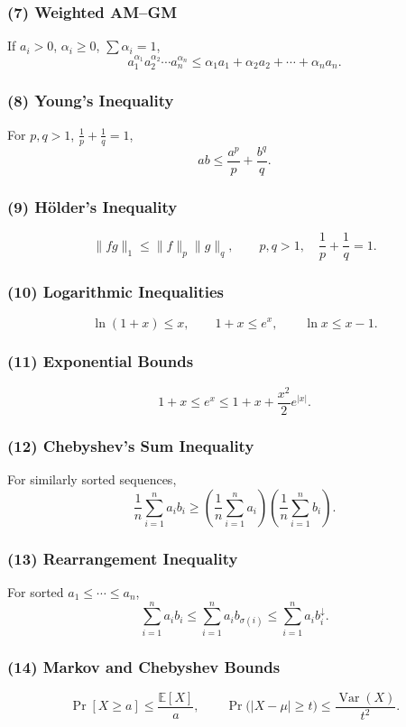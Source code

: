 \documentclass[10pt]{article}
\theoremstyle{definition}
\begin{document}
\subsubsection*{(7) Weighted AM--GM}
If \(a_i > 0\), \(\alpha_i \ge 0\), \(\sum\alpha_i = 1\),
\[
a_1^{\alpha_1} a_2^{\alpha_2}\cdots a_n^{\alpha_n}
\le
\alpha_1 a_1 + \alpha_2 a_2 + \cdots + \alpha_n a_n.
\]

\subsubsection*{(8) Young's Inequality}
For \(p,q>1\), \(\tfrac{1}{p}+\tfrac{1}{q}=1\),
\[
ab \le \frac{a^p}{p} + \frac{b^q}{q}.
\]

\subsubsection*{(9) Hölder's Inequality}
\[
\|fg\|_1 \le \|f\|_p \|g\|_q,
\qquad
p,q>1,\quad \frac{1}{p}+\frac{1}{q}=1.
\]

\subsubsection*{(10) Logarithmic Inequalities}
\[
\ln(1+x)\le x,\qquad
1+x \le e^x,\qquad
\ln x \le x-1.
\]

\subsubsection*{(11) Exponential Bounds}
\[
1+x \le e^x \le 1 + x + \frac{x^2}{2}e^{|x|}.
\]

\subsubsection*{(12) Chebyshev's Sum Inequality}
For similarly sorted sequences,
\[
\frac{1}{n}\sum_{i=1}^n a_i b_i
\ge
\left(\frac{1}{n}\sum_{i=1}^n a_i\right)
\left(\frac{1}{n}\sum_{i=1}^n b_i\right).
\]

\subsubsection*{(13) Rearrangement Inequality}
For sorted \(a_1 \le \cdots \le a_n\),
\[
\sum_{i=1}^n a_i b_i
\le
\sum_{i=1}^n a_i b_{\sigma(i)}
\le
\sum_{i=1}^n a_i b_i^{\downarrow}.
\]

\subsubsection*{(14) Markov and Chebyshev Bounds}
\[
\Pr[X\ge a] \le \frac{\mathbb{E}[X]}{a},
\qquad
\Pr\big(|X-\mu|\ge t\big)\le \frac{\operatorname{Var}(X)}{t^2}.
\]
\end{document}
